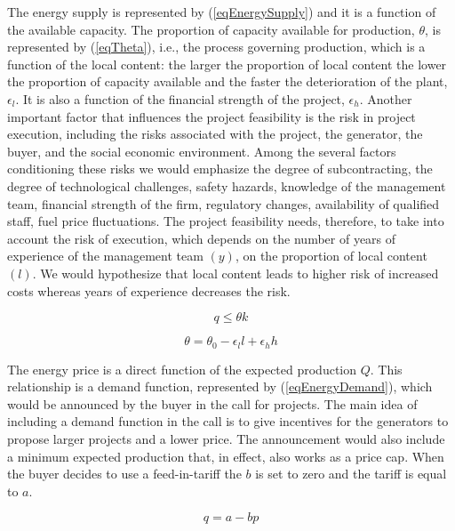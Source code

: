\documentclass[informs]{informs3}
\begin{document}
The energy supply is represented by (\ref{eqEnergySupply}) and it is a function of the available capacity. The  proportion of capacity available for production, $\theta$, is represented by (\ref{eqTheta}), i.e., the process governing production, which is a function of the local content: the larger the proportion of local content the lower the proportion of capacity available and the faster the deterioration of the plant, $\epsilon_l$. It is also a function of the financial strength of the project, $\epsilon_h$. Another important factor that influences the project feasibility is the risk in project execution, including the risks associated with the project, the generator, the buyer, and the social economic environment. Among the several factors conditioning these risks we would emphasize the degree of subcontracting, the degree of technological challenges, safety hazards, knowledge of the management team, financial strength of the firm, regulatory changes, availability of qualified staff, fuel price fluctuations. The project feasibility needs, therefore, to take into account the risk of execution, which depends on the number of years of experience of the management team $(y)$, on the proportion of local content $(l)$. We would hypothesize that local content leads to higher risk of increased costs whereas years of experience decreases the risk. 

\begin{equation} \label{eqEnergySupply}
q \leq \theta k
\end{equation}

\begin{equation} \label{eqTheta}
\theta = \theta_0-\epsilon_l l +\epsilon_h h
\end{equation}

The energy price is a direct function of the expected production $Q$. This relationship is a demand function, represented by (\ref{eqEnergyDemand}), which would be announced by the buyer in the call for projects. The main idea of including a demand function in the call is to give incentives for the generators to propose larger projects and a lower price. The announcement would also include a minimum expected production that, in effect, also works as a price cap. When the buyer decides to use a feed-in-tariff the $b$ is set to zero and the tariff is equal to $a$.

\begin{equation} \label{eqEnergyDemand}
q = a - bp
\end{equation}
\end{document}
